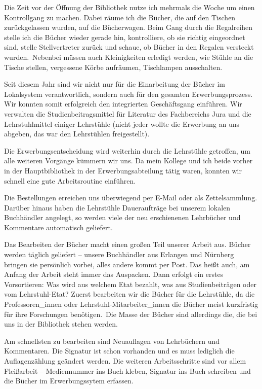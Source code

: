 \documentclass[a4paper,
fontsize=11pt,
oneside,
numbers=noperiodatend,
parskip=half-,
bibliography=totoc,
final
]{scrartcl}
\begin{document}
Die Zeit vor der Öffnung der Bibliothek nutze ich mehrmals die Woche um
einen Kontrollgang zu machen. Dabei räume ich die Bücher, die auf den
Tischen zurückgelassen wurden, auf die Bücherwagen. Beim Gang durch die
Regalreihen stelle ich die Bücher wieder gerade hin, kontrolliere, ob
sie richtig eingeordnet sind, stelle Stellvertreter zurück und schaue,
ob Bücher in den Regalen versteckt wurden.~Nebenbei müssen auch
Kleinigkeiten erledigt werden, wie Stühle an die Tische stellen,
vergessene Körbe aufräumen, Tischlampen ausschalten.

Seit diesem Jahr sind wir nicht nur für die Einarbeitung der Bücher im
Lokalsystem verantwortlich, sondern auch für den gesamten
Erwerbungsprozess. Wir konnten somit erfolgreich den integrierten
Geschäftsgang einführen. Wir verwalten die Studienbeitragsmittel für
Literatur des Fachbereichs Jura und die Lehrstuhlmittel einiger
Lehrstühle (nicht jeder wollte die Erwerbung an uns abgeben, das war den
Lehrstühlen freigestellt).

Die Erwerbungsentscheidung wird weiterhin durch die Lehrstühle
getroffen, um alle weiteren Vorgänge kümmern wir uns. Da mein Kollege
und ich beide vorher in der Hauptbibliothek in der Erwerbungsabteilung
tätig waren, konnten wir schnell eine gute Arbeitsroutine einführen.~~

Die Bestellungen erreichen uns überwiegend per E-Mail oder als
Zettelsammlung. Darüber hinaus haben die Lehrstühle Daueraufträge bei
unserem lokalen Buchhändler angelegt, so werden viele der neu
erschienenen Lehrbücher und Kommentare automatisch geliefert.

Das Bearbeiten der Bücher macht einen großen Teil unserer Arbeit aus.
Bücher werden täglich geliefert -- unsere Buchhändler aus Erlangen und
Nürnberg bringen sie persönlich vorbei, alles andere kommt per Post. Das
heißt auch, am Anfang der Arbeit steht immer das Auspacken. Dann erfolgt
ein erstes Vorsortieren: Was wird aus welchem Etat bezahlt, was aus
Studienbeiträgen oder vom Lehrstuhl-Etat? Zuerst bearbeiten wir die
Bücher für die Lehrstühle, da die Professoren\_innen oder
Lehrstuhl-Mitarbeiter\_innen die Bücher meist kurzfristig für ihre
Forschungen benötigen.~Die Masse der Bücher sind allerdings die, die bei
uns in der Bibliothek stehen werden.~

Am schnellsten zu bearbeiten sind Neuauflagen von Lehrbüchern und
Kommentaren. Die Signatur ist schon vorhanden und es muss lediglich die
Auflagenzählung geändert werden. Die weiteren Arbeitsschritte sind vor
allem Fleißarbeit -- Mediennummer ins Buch kleben, Signatur ins Buch
schreiben und die Bücher im Erwerbungssytem erfassen.
\end{document}
